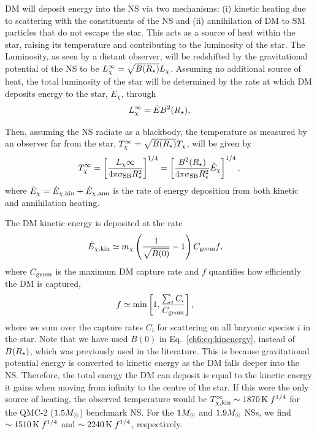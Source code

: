 DM will deposit energy into the NS via two mechanisms: (i) kinetic heating due to scattering with the constituents of the NS and (ii) annihilation of DM to SM particles that do not escape the star. 
This acts as a source of heat within the star, raising its temperature and contributing to the luminosity of the star. The Luminosity, as seen by a distant observer, will be redshifted by the gravitational potential of the NS to be $L^\infty_\chi = \sqrt{B(R_\star)} L_\chi$. Assuming no additional source of heat, the total luminosity of the star will  be determined by the rate at which DM deposits energy to the star, $\dot E_\chi$, through
\begin{equation}
  L_\chi^\infty = \dot{E} B^2(R_\star), 
  \label{eq:DM_lumin}
\end{equation} 

Then, assuming the NS radiate as a blackbody, the temperature as measured by an observer far from the star, $T^\infty_{\chi}=\sqrt{B(R_\star)} T_\chi$, will be given by 
\begin{equation}
        T^\infty_{\chi}  = \left[ \frac{ L_\chi\infty}{4\pi \sigma_\mathrm{SB} R_\star^2}\right]^{1/4} = \left[\frac{B^2(R_\star)}{4\pi\sigma_\text{SB} R_\star^2} \dot{E}_{\chi}  \right]^{1/4},
\label{eq:Tkin} 
\end{equation}
where $\dot E_{\chi}= \dot E_{\chi, \rm kin} + \dot E_{\chi, \rm ann}$ is the rate of energy deposition from both kinetic and annihilation heating.

%

The DM kinetic energy is deposited at the rate
\begin{align}
  \dot E_{\chi, \rm kin} & \simeq m_\chi \left( \frac{1}{\sqrt{B(0)}} - 1\right)C_{\rm geom}f, \label{ch6:eq:kinenergy}
\end{align}
where $C_{\rm geom}$ is the maximum DM capture rate and $f$ quantifies how efficiently the DM is captured, 
\begin{align}
  f & \simeq \min\left[ 1,  \frac{ \sum_i C_i}{C_{\rm geom}} \right],
\end{align}
where we sum over the capture rates $C_i$ for scattering on all baryonic species $i$ in the star. 
Note that we have used $B(0)$ in Eq.~\ref{ch6:eq:kinenergy}, instead of $B(R_\star)$, which was previously used in the literature. This is because gravitational potential energy is converted to kinetic energy as the DM falls deeper into the NS. Therefore, the total energy the DM can deposit is equal to the kinetic energy it gains when moving from infinity to the centre of the star. 
If this were the only source of heating, the observed temperature would be  $T^\infty_{\chi,\rm kin}  \sim 1870{\rm \,K}\;f^{1/4}$ for the QMC-2 ($1.5M_\odot$) benchmark NS. For the $1M_\odot$ and $1.9M_\odot$ NSs, we find 
$\sim 1510{\rm \,K}\; f^{1/4}$ and $\sim2240{\rm \,K}\; f^{1/4}$, respectively.


